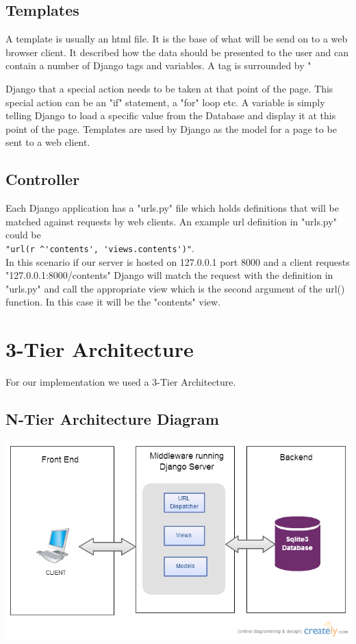 \documentclass{l3proj}
\begin{document}
\subsection{Templates}
A template is usually an html file. It is the base of what will be send on to a web browser 
client. It described how the data should be presented to the user and can contain a 
number of Django tags and variables. A tag is surrounded by "{%
Django that a special action needs to be taken at that point of the page. This special 
action can be an "if" statement, a "for" loop etc. A variable is simply telling Django to load 
a specific value from the Database and display it at this point of the page. Templates are 
used by Django as the model for a page to be sent to a web client.
\subsection{Controller}
Each Django application has a "urls.py" file which holds definitions that will be matched 
against requests by web clients. An example url definition in "urls.py" could be \\
\verb|"url(r ^'contents', 'views.contents')"|. \\In this scenario if our server is hosted on 127.0.0.1 
port 8000 and a client requests "127.0.0.1:8000/contents" Django will match the 
request with the definition in "urls.py" and call the appropriate view which is the second 
argument of the url() function. In this case it will be the "contents" view.
\section{3-Tier Architecture}
For our implementation we used a 3-Tier Architecture.
\subsection{N-Tier Architecture Diagram}
 \includegraphics[width=\linewidth]{images/ntier.jpg}
}
\end{document}
